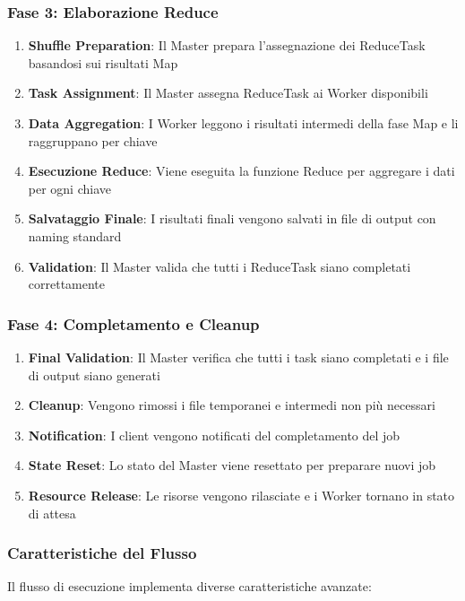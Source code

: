 \documentclass[12pt,a4paper]{article}
\begin{document}
\subsubsection{Fase 3: Elaborazione Reduce}

\begin{enumerate}
\item \textbf{Shuffle Preparation}: Il Master prepara l'assegnazione dei ReduceTask basandosi sui risultati Map
\item \textbf{Task Assignment}: Il Master assegna ReduceTask ai Worker disponibili
\item \textbf{Data Aggregation}: I Worker leggono i risultati intermedi della fase Map e li raggruppano per chiave
\item \textbf{Esecuzione Reduce}: Viene eseguita la funzione Reduce per aggregare i dati per ogni chiave
\item \textbf{Salvataggio Finale}: I risultati finali vengono salvati in file di output con naming standard
\item \textbf{Validation}: Il Master valida che tutti i ReduceTask siano completati correttamente
\end{enumerate}

\subsubsection{Fase 4: Completamento e Cleanup}

\begin{enumerate}
\item \textbf{Final Validation}: Il Master verifica che tutti i task siano completati e i file di output siano generati
\item \textbf{Cleanup}: Vengono rimossi i file temporanei e intermedi non più necessari
\item \textbf{Notification}: I client vengono notificati del completamento del job
\item \textbf{State Reset}: Lo stato del Master viene resettato per preparare nuovi job
\item \textbf{Resource Release}: Le risorse vengono rilasciate e i Worker tornano in stato di attesa
\end{enumerate}

\subsubsection{Caratteristiche del Flusso}

Il flusso di esecuzione implementa diverse caratteristiche avanzate:
\end{document}
